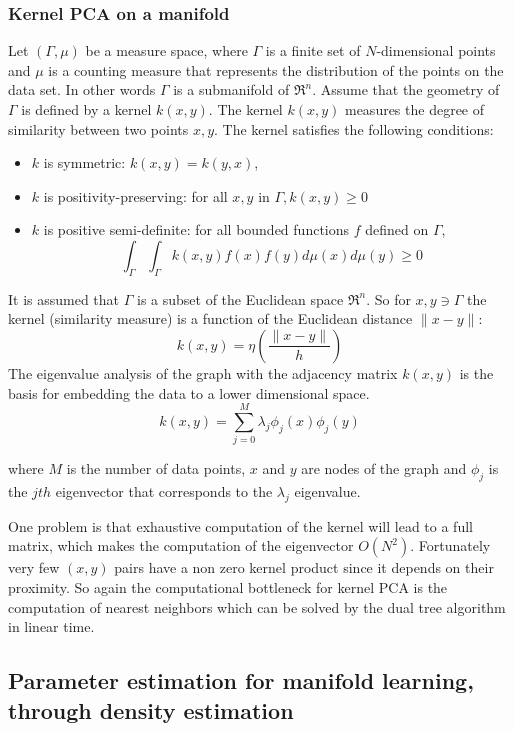 \documentclass[12pt,letterpaper,doublespaced,ETD,dvips,proposal]{gtthesis}
\begin{document}
\begin{Body}
\subsubsection{Kernel PCA on a manifold}
\label{Kernel_PCA_on_a_manifold}

Let  $(\Gamma,\mu)$ be a measure space, where $\Gamma$ is a finite
set of $N$-dimensional points and $\mu$ is a counting measure that
represents the distribution of the points on the data set. In other
words $\Gamma$ is a submanifold of $\Re^{n}$. Assume that the
geometry of $\Gamma$ is defined by a kernel $k(x,y)$. The kernel
$k(x,y)$ measures the degree of similarity between two points $x,y$.
The kernel satisfies the following conditions:
\begin{itemize}
    \item   $k$ is symmetric: $k(x,y)=k(y,x)$,
    \item   $k$ is positivity-preserving: for all $x,y$ in
$\Gamma, k(x,y)\geq 0$
    \item   $k$ is positive semi-definite: for all bounded
functions $f$ defined on  $\Gamma$,
\[
\int_{\Gamma} \int_{\Gamma} k(x,y)f(x)f(y)d\mu(x)d\mu(y)\geq 0\]
\end{itemize}
It is assumed that $\Gamma$ is a subset of the Euclidean space
$\Re^{n}$. So for $x,y\ni\Gamma$ the kernel (similarity measure) is
a function of the Euclidean distance $\parallel x-y\parallel:$
\[
 k(x,y)=\eta(\frac{\parallel x-y\parallel}{h})
\]
The eigenvalue analysis of the graph with the adjacency matrix
$k(x,y)$ is the basis for embedding the data to a lower dimensional
space.
\[
    k(x,y)=\sum_{j=0}^{M} \lambda_{j}\phi_{j}(x)\phi_{j}(y)
\]

where $M$ is the number of data points, $x$ and $y$ are nodes of the
graph and $\phi_j$ is the $jth$ eigenvector that corresponds to the
$\lambda_j$ eigenvalue.

One problem is that exhaustive computation of the kernel will lead
to a full matrix, which makes the computation of the eigenvector
$O(N^2)$. Fortunately very few $(x,y)$ pairs have a non zero kernel
product since it depends on their proximity. So again the
computational bottleneck for kernel PCA is the computation of
nearest neighbors which can be solved by the dual tree algorithm in
linear time.

\subsection{Parameter estimation for manifold learning, through density estimation}


\end{Body}
\end{document}
